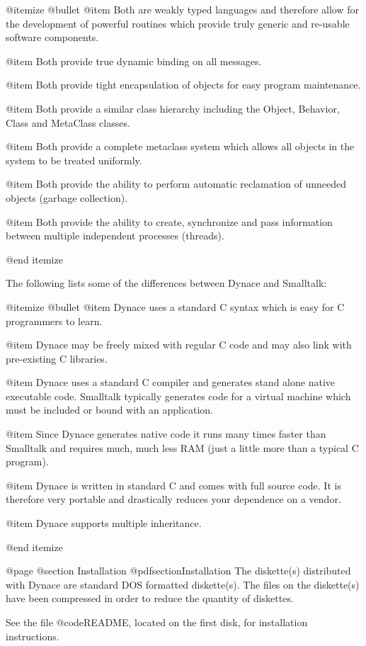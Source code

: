 @itemize @bullet
@item
Both are weakly typed languages and therefore allow
for the development of powerful routines which provide truly generic
and re-usable software components.

@item
Both provide true dynamic binding on all messages.

@item
Both provide tight encapsulation of objects for
easy program maintenance.

@item
Both provide a similar class hierarchy including
the Object, Behavior, Class and MetaClass classes.

@item
Both provide a complete metaclass system which allows
all objects in the system to be treated uniformly.

@item
Both provide the ability to perform automatic reclamation
of unneeded objects (garbage collection).

@item
Both provide the ability to create, synchronize and
pass information between multiple independent processes (threads).

@end itemize


The following lists some of the differences between Dynace and
Smalltalk:

@itemize @bullet
@item
Dynace uses a standard C syntax which is easy for C programmers to learn.

@item
Dynace may be freely mixed with regular C code and may also link with
pre-existing C libraries.

@item
Dynace uses a standard C compiler and generates stand alone native
executable code.  Smalltalk typically generates code for a virtual
machine which must be included or bound with an application.

@item
Since Dynace generates native code it runs many times faster than Smalltalk
and requires much, much less RAM (just a little more than a typical C
program).

@item
Dynace is written in standard C and comes with full source code.  It is
therefore very portable and drastically reduces your dependence on a
vendor.

@item
Dynace supports multiple inheritance.

@end itemize




@page
@section Installation
@pdfsection{Installation}
The diskette(s) distributed with Dynace are standard DOS formatted
diskette(s).  The files on the diskette(s) have been compressed in order
to reduce the quantity of diskettes. 

See the file @code{README}, located on the first disk, for
installation instructions.






